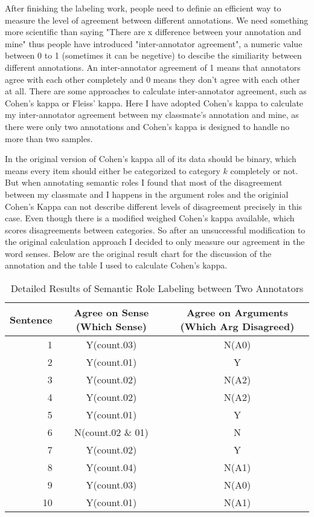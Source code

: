 \documentclass[11pt]{article} %
\begin{document}
After finishing the labeling work, people need to definie an efficient way to measure the level of agreement between different annotations. We need something more scientific than saying "There are x difference between your annotation and mine" thus people have introduced "inter-annotator agreement", a numeric value between 0 to 1 (sometimes it can be negetive) to descibe the similiarity between different annotations. An inter-annotator agreement of 1 means that annotators agree with each other completely and 0 means they don't agree with each other at all. There are some approaches to calculate inter-annotator agreement, such as Cohen's kappa\cite{BibEntry2018Dec} or Fleiss' kappa\cite{BibEntry2018Nov}. Here I have adopted Cohen's kappa to calculate my inter-annotator agreement between my classmate's annotation and mine, as there were only two annotations and Cohen's kappa is designed to handle no more than two samples.

In the original version of Cohen's kappa all of its data should be binary, which means every item should either be categorized to category $k$ completely or not. But when annotating semantic roles I found that most of the disagreement between my classmate and I happens in the argument roles and the originial Cohen's Kappa can not describe different levels of disagreement precisely in this case. Even though there is a modified weighed Cohen's kappa available, which scores disagreements between categories\cite{cohen1968weighted}. So after an unsuccessful modification to the original calculation approach I decided to only measure our agreement in the word senses. Below are the original result chart for the discussion of the annotation and the table I used to calculate Cohen's kappa.

\begin{table}[h]
    \begin{center}
        \caption{Detailed Results of Semantic Role Labeling between Two Annotators}
        \label{tab:table1}
        \begin{tabular}{r|c|c}
            \textbf{Sentence} & \textbf{Agree on Sense (Which Sense)} & \textbf{Agree on Arguments (Which Arg Disagreed)}\\
            \hline
            1 & Y(count.03) & N(A0)\\
            2 & Y(count.01) & Y\\
            3 & Y(count.02) & N(A2)\\
            4 & Y(count.02) & N(A2)\\
            5 & Y(count.01) & Y\\
            6 & N(count.02 \& 01) & N\\
            7 & Y(count.02) & Y\\
            8 & Y(count.04) & N(A1)\\
            9 & Y(count.03) & N(A0)\\
            10 & Y(count.01) & N(A1)\\
        \end{tabular}
    \end{center}
\end{table}
\end{document}
